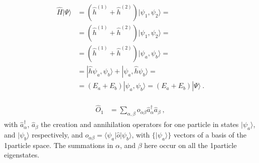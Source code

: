 \documentclass[letterpaper,10pt,english]{jupyterBook}
\begin{document}
\begin{itemize}
\begin{equation*}
\begin{split}\begin{aligned}
    \hat{H} | \Psi \rangle
    & = \left( \hat{h}^{(1)} + \hat{h}^{(2)} \right) | \psi_1, \psi_2 \rangle = \\
    & = \left( \hat{h}^{(1)} + \hat{h}^{(2)} \right) | \psi_1, \psi_2 \rangle = \\
    & = \left( \hat{h}^{(1)} + \hat{h}^{(2)} \right) | \psi_a, \psi_b \rangle = \\
    & = | \hat{h} \psi_a, \psi_b \rangle +  | \psi_a, \hat{h} \psi_b \rangle = \\
    & = \left( E_a + E_b \right) | \psi_a, \psi_b \rangle = \left( E_a + E_b \right) | \Psi \rangle \ .
  \end{aligned}\end{split}
\end{equation*}
\end{itemize}

\sphinxAtStartPar
{}
\begin{equation}\label{equation:ch/quantum-mechanics/many-body/operators:eq:qft:operator:one-body:second-quantization}
\begin{split}\begin{aligned}
  \hat{O}_1
  & = \sum_{\alpha, \beta} o_{\alpha \beta} \hat{a}_{\alpha}^\dagger \hat{a}_\beta \ , 
\end{aligned}\end{split}
\end{equation}
\sphinxAtStartPar
with \(\hat{a}^\dagger_{\alpha}\), \(\hat{a}_{\beta}\) the creation and annihilation operators for one particle in states \(| \psi_a \rangle\), and \(| \psi_b \rangle\) respectively, and \(o_{\alpha \beta} = \langle \psi_a | \hat{o} | \psi_b \rangle\), with \(\{ | \psi_a \rangle \}\) vectors of a basis of the 1\sphinxhyphen{}particle space. The summations in \(\alpha\), and \(\beta\) here occur on all the 1\sphinxhyphen{}particle eigenstates.
\end{document}
